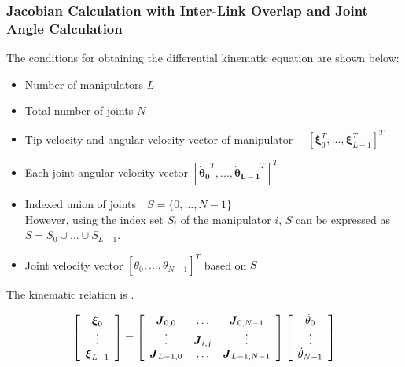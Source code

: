 \subsubsection{Jacobian Calculation with Inter-Link Overlap and Joint Angle Calculation}
The conditions for obtaining the differential kinematic equation are shown below:
\begin{itemize}
\item Number of manipulators $L$
\item Total number of joints $N$
\item Tip velocity and angular velocity vector of manipulator　
$[\bm{\xi}_0^T,...,\bm{\xi}_{L-1}^T]^T$
\item Each joint angular velocity vector
$[\bm{\dot{\theta}_0}^T,...,\bm{\dot{\theta}_{L-1}}^T]^T$
\item Indexed union of joints　$S = \{0,\hdots,N-1\}$\\
However, using the index set $S_i$ of the manipulator $i$, $S$ can be expressed as $S = S_0 \cup \hdots \cup S_{L-1}$.
\item Joint velocity vector $[\dot{\theta}_0, ..., \dot{\theta}_{N-1}]^T$ based on $S$
\end{itemize}

The kinematic relation is .

\begin{eqnarray}
\left[
\begin{array}{c}
\bm{\xi}_0 \\
\vdots\\
\bm{\xi}_{L-1}
\end{array}
\right]
=
\left[
\begin{array}{ccc}
\bm{J}_{0,0}   &        \hdots & \bm{J}_{0, N-1}\\
\vdots         &  \bm{J}_{i,j} & \vdots\\
\bm{J}_{L-1,0} &        \hdots & \bm{J}_{L-1, N-1}
\end{array}
\right]
\left[
\begin{array}{c}
\dot{\theta}_0\\
\vdots\\
\dot{\theta}_{N-1}
\end{array}
\right]
\labeq{multi-manipulator-jacobi-eq}
\end{eqnarray}

